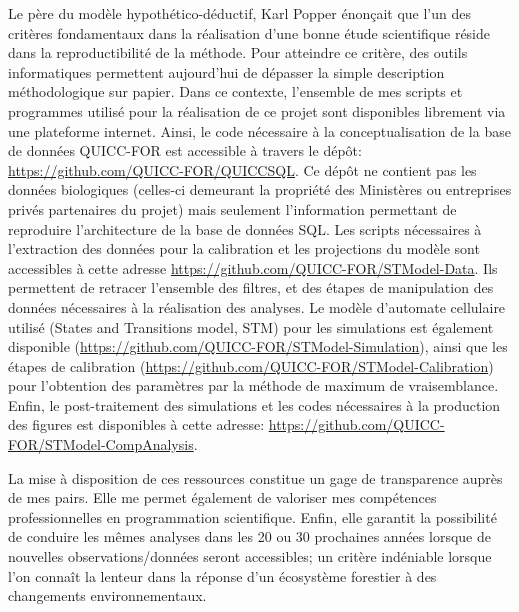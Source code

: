 Le père du modèle hypothético-déductif, Karl Popper énonçait que l'un des critères fondamentaux dans
la réalisation d'une bonne étude scientifique réside dans la reproductibilité de la méthode. Pour
atteindre ce critère, des outils informatiques permettent aujourd'hui de dépasser la simple
description méthodologique sur papier. Dans ce contexte, l'ensemble de mes scripts et programmes
utilisé pour la réalisation de ce projet sont disponibles librement via une plateforme internet.
Ainsi, le code nécessaire à la conceptualisation de la base de données QUICC-FOR est accessible à
travers le dépôt: \url{https://github.com/QUICC-FOR/QUICCSQL}. Ce dépôt ne contient pas les données
biologiques (celles-ci demeurant la propriété des Ministères ou entreprises privés partenaires du
projet) mais seulement l'information permettant de reproduire l'architecture de la base de données
SQL. Les scripts nécessaires à l'extraction des données pour la calibration et les projections du
modèle sont accessibles à cette adresse \url{https://github.com/QUICC-FOR/STModel-Data}. Ils
permettent de retracer l'ensemble des filtres, et des étapes de manipulation des données nécessaires à
la réalisation des analyses. Le modèle d'automate cellulaire utilisé (States and Transitions model,
STM) pour les simulations est également disponible
(\url{https://github.com/QUICC-FOR/STModel-Simulation}), ainsi que les étapes de calibration
(\url{https://github.com/QUICC-FOR/STModel-Calibration}) pour l'obtention des paramètres par la
méthode de maximum de vraisemblance. Enfin, le post-traitement des simulations et les codes
nécessaires à la production des figures est disponibles à cette adresse:
\url{https://github.com/QUICC-FOR/STModel-CompAnalysis}. 

La mise à disposition de ces ressources
constitue un gage de transparence auprès de mes pairs. Elle me permet également de valoriser mes
compétences professionnelles en programmation scientifique. Enfin, elle garantit la possibilité de
conduire les mêmes analyses dans les 20 ou 30 prochaines années lorsque de nouvelles
observations/données seront accessibles; un critère indéniable lorsque l'on connaît la lenteur dans
la réponse d'un écosystème forestier à des changements environnementaux.



